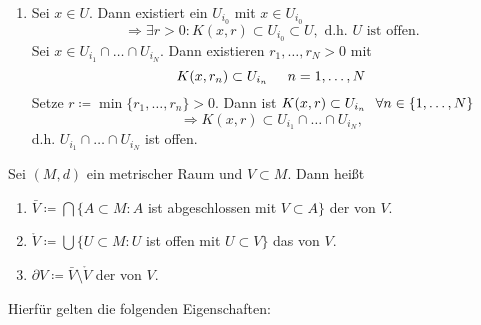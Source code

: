 \begin{prop}
\begin{beweis}
\begin{enumerate}[label=\alph*\upshape)]
			\item Sei $x \in U$. Dann existiert ein $U_{i_{0}}$ mit $x \in U_{i_{0}}$
			\[ \Rightarrow \exists r > 0: K(x, r) \subset U_{i_{0}} \subset U, \text{ d.h. } U \text{ ist offen.}  \]
			Sei $x \in U_{i_{1}} \cap \dotsc \cap U_{i_{N}}.$ Dann existieren $r_{1}, \dotsc, r_{N} > 0$ mit
			\[ K(x, r_{n}) \subset U_{i_{n}} \hspace{0.5cm} n = 1, \dotsc, N \]
			Setze $r \coloneqq \min \{ r_{1}, \dotsc, r_{n} \} > 0$. Dann ist $K(x, r) \subset U_{i_{n}} \hspace{0.25cm} \forall n \in \{ 1, \dotsc, N \}$
			\[ \Rightarrow K(x, r) \subset U_{i_{1}} \cap \dotsc \cap U_{i_{N}}, \]
			d.h. $U_{i_{1}} \cap \dotsc \cap U_{i_{N}}$ ist offen.
		\end{enumerate}	
	\end{beweis}
\end{prop}


\begin{definition} \label{def:4.7-AbschlussInnereRand}
	Sei $(M, d)$ ein metrischer Raum und $V \subset M$. Dann hei{\ss}t 
	\begin{enumerate}[label=\alph*\upshape)]
		\item $\bar V \coloneqq \bigcap \{ A \subset M: A$ ist abgeschlossen mit $V \subset A \} $ der  von $V$.
		\item $\mathring V \coloneqq \bigcup \{ U \subset M: U$ ist offen mit $U \subset V \}$ das  von $V$. 
		\item $ \partial V \coloneqq \bar V \setminus \mathring V$ der  von $V$.
	\end{enumerate}
\end{definition}


Hierfür gelten die folgenden Eigenschaften:


